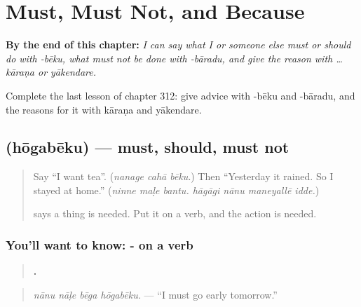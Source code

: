 
\chapter{Must, Must Not, and Because}
\label{ch:ka-must-must-not-and-because}

\begin{chapteropening}
\textbf{By the end of this chapter:} \emph{I can say what I or someone else must or should do with -bēku, what must not be done with -bāradu, and give the reason with … kāraṇa or yākendare.}

Complete the last lesson of chapter 312: give advice with -bēku and -bāradu, and the reasons for it with kāraṇa and yākendare.
\end{chapteropening}

\section[\texorpdfstring{\kn{ಹೋಗಬೇಕು} (hōgabēku)}{ಹೋಗಬೇಕು (hōgabēku)}]{ (hōgabēku) — must, should, must not}

\label{lesson:KA-C312-hogabeku}



\begin{quote}
Say \textquotedblleft{}I want tea\textquotedblright{}. (\emph{nanage cahā bēku}.) Then \textquotedblleft{}Yesterday it rained. So I stayed at home.\textquotedblright{} (\emph{ninne maḷe bantu. hāgāgi nānu maneyallē idde.})

\textbf{} says a thing is needed. Put it on a verb, and the action is needed.
\end{quote}

\subsection*{You'll want to know: - on a verb}
\begin{quote}
\textbf{   .}
\end{quote}

\begin{quote}
\emph{nānu nāḷe bēga hōgabēku.} — \textquotedblleft{}I must go early tomorrow.\textquotedblright{}
\end{quote}


